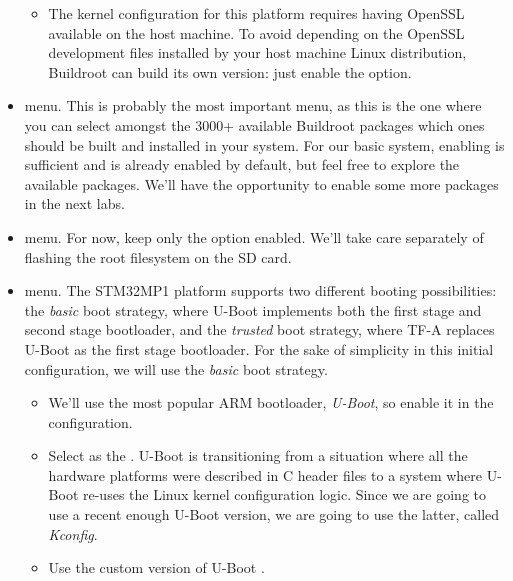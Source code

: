 \begin{itemize}
\begin{itemize}
  \item The kernel configuration for this platform requires having
    OpenSSL available on the host machine. To avoid depending on the
    OpenSSL development files installed by your host machine Linux
    distribution, Buildroot can build its own version: just enable the
     option.

  \end{itemize}

\item {} menu. This is probably the most important
  menu, as this is the one where you can select amongst the 3000+
  available Buildroot packages which ones should be built and
  installed in your system. For our basic system, enabling
   is sufficient and is already enabled by default, but
  feel free to explore the available packages. We'll have the
  opportunity to enable some more packages in the next labs.

\item {} menu. For now, keep only the  option enabled. We'll take care separately of
  flashing the root filesystem on the SD card.

\item {} menu. The STM32MP1 platform supports two
  different booting possibilities: the {\em basic} boot strategy,
  where U-Boot implements both the first stage and second stage
  bootloader, and the {\em trusted} boot strategy, where TF-A replaces
  U-Boot as the first stage bootloader. For the sake of simplicity in
  this initial configuration, we will use the {\em basic} boot
  strategy.

  \begin{itemize}

  \item We'll use the most popular ARM bootloader, {\em U-Boot}, so
    enable it in the configuration.

  \item Select  as the . U-Boot is
    transitioning from a situation where all the hardware platforms
    were described in C header files to a system where U-Boot re-uses
    the Linux kernel configuration logic. Since we are going to use a
    recent enough U-Boot version, we are going to use the latter,
    called {\em Kconfig}.

  \item Use the custom version of U-Boot .


\end{itemize}
\end{itemize}
